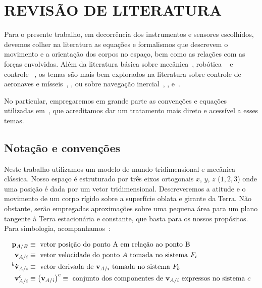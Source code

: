 \chapter{REVISÃO DE LITERATURA}\label{chap:fundamentacaoTeorica}

Para o presente trabalho, em decorrência dos instrumentos e sensores escolhidos, devemos colher na literatura as equações e formalismos que descrevem o movimento e a orientação dos corpos no espaço, bem como as relações com as forças envolvidas. Além da literatura básica sobre mecânica~\cite{Goldstein1980}, robótica ~\cite{Craig2014} e controle ~\cite{Ogata2010}, os temas são mais bem explorados na literatura sobre controle de aeronaves e mísseis~\cite{Henderson1997}, \cite{Stevens2016}, \cite{Blakelock1991} ou sobre navegação inercial~\cite{Stovall1997}, \cite{Weston2004}, \cite{Wang2021} e~\cite{Haoran2019}.

No particular, empregaremos em grande parte as convenções e equações utilizadas em~\cite{Stevens2016}, que acreditamos dar um tratamento mais direto e acessível a esses temas.

\section{Notação e convenções}

Neste trabalho utilizamos um modelo de mundo tridimensional e mecânica clássica.  Nosso espaço é estruturado por três eixos ortogonais \(x\), \(y\), \(z\) (\(1, 2, 3\)) onde uma posição é dada por um vetor tridimensional. Descreveremos a atitude e o movimento de um corpo rígido sobre a superfície oblata e girante da Terra. Não obstante, serão empregadas aproximações sobre uma pequena área para um plano tangente à Terra estacionária e constante, que basta\footnotemark{} para os nossos propósitos. Para simbologia, acompanhamos~\cite{Stevens2016}:

\begin{align*}
    \mathbf{p}_{A/B} &\equiv
    \text{ vetor posição do ponto A em relação ao ponto B} \\
    \mathbf{v}_{A/i} &\equiv
    \text{ vetor velocidade do ponto \(A\) tomada no sistema \(F_{i}\)} \\
    ^{b}\mathbf{\dot{v}}_{A/i} &\equiv
    \text{ vetor derivada de \(\mathbf{v}_{A/i}\) tomada no sistema \( F_{b}\)} \\
    \mathbf{v}^{c}_{A/i} &\equiv \left( \mathbf{v}_{A/i} \right)^{c} \equiv
    \text{ conjunto dos componentes de \(\mathbf{v}_{A/i}\) expressos no sistema \(c\)} \\
\end{align*}

